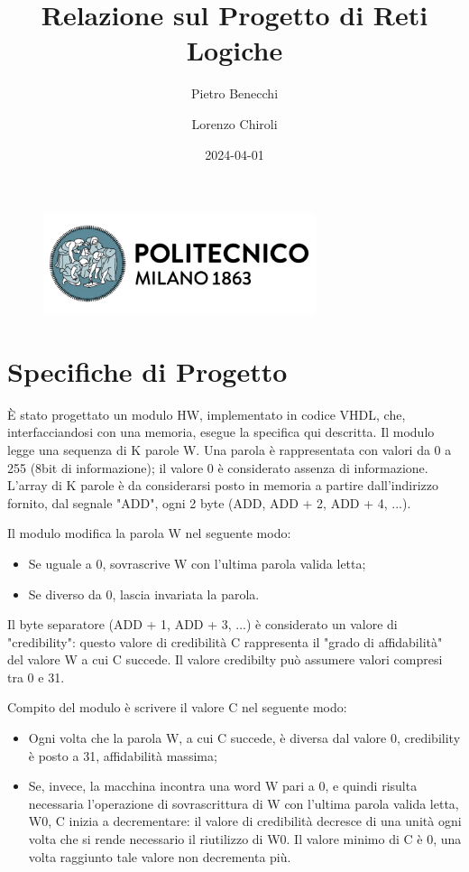\documentclass[a4paper]{article}
\title{Relazione sul Progetto di Reti Logiche}
\author[1]{Pietro Benecchi}
\author[2]{Lorenzo Chiroli}
\affil[1]{10782465 - pietro.benecchi@mail.polimi.it}
\affil[2]{10797603 - lorenzo.chiroli@mail.polimi.it}
\date{2024-04-01}
\begin{document}
\begin{figure}[t]
\centerline{\includegraphics[width=8cm]{resources/LogoPolimi.png}}
\end{figure}
\maketitle
\tableofcontents
\newpage

\section{Specifiche di Progetto}
È stato progettato un modulo HW, implementato in codice VHDL, che, interfacciandosi con una memoria, esegue la specifica qui descritta.
Il modulo legge una sequenza di K parole W. Una parola è rappresentata con valori da 0 a 255 (8bit di informazione); il valore 0 è considerato assenza di informazione. L'array di K parole è da considerarsi posto in memoria a partire dall'indirizzo fornito, dal segnale "ADD", ogni 2 byte (ADD, ADD + 2, ADD + 4, ...). 

Il modulo modifica la parola W nel seguente modo:

\begin{itemize}
  \item Se uguale a 0, sovrascrive W con l'ultima parola valida letta;
  \item Se diverso da 0, lascia invariata la parola.
\end{itemize}

Il byte separatore (ADD + 1, ADD + 3, ...) è considerato un valore di "credibility": questo valore di credibilità C rappresenta il "grado di affidabilità" del valore W a cui C succede. Il valore credibilty può assumere valori compresi tra 0 e 31.

Compito del modulo è scrivere il valore C nel seguente modo:

\begin{itemize}
  \item Ogni volta che la parola W, a cui C succede, è diversa dal valore 0, credibility è posto a 31, affidabilità massima;
  \item Se, invece, la macchina incontra una word W pari a 0, e quindi risulta necessaria l'operazione di sovrascrittura di W con l'ultima parola valida letta, W0, C inizia a decrementare: il valore di credibilità decresce di una unità ogni volta che si rende necessario il riutilizzo di W0. Il valore minimo di C è 0, una volta raggiunto tale valore non decrementa più.
\end{itemize}
\end{document}
